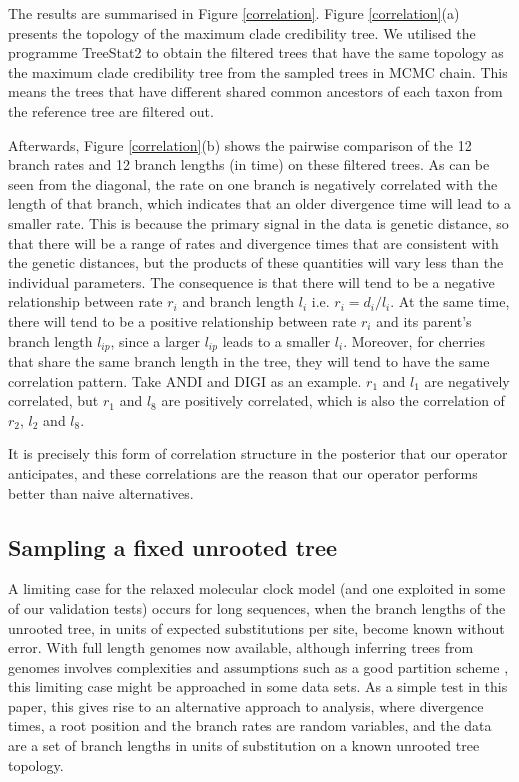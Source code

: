 \documentclass{bmcart}
\begin{document}
The results are summarised in Figure \ref{correlation}. Figure \ref{correlation}(a) presents the topology of the maximum clade credibility tree. We utilised the programme TreeStat2 \cite{TreeStat2} to obtain the filtered trees that have the same topology as the maximum clade credibility tree from the sampled trees in MCMC chain. This means the trees that have different shared common ancestors of each taxon from the reference tree are filtered out. 

Afterwards, Figure \ref{correlation}(b) shows the pairwise comparison of the 12 branch rates and 12 branch lengths (in time) on these filtered trees. As can be seen from the diagonal, the rate on one branch is negatively correlated with the length of that branch, which indicates that an older divergence time will lead to a smaller rate. This is because the primary signal in the data is genetic distance, so that there will be a range of rates and divergence times that are consistent with the genetic distances, but the products of these quantities will vary less than the individual parameters. The consequence is that there will tend to be a negative relationship between rate ${r_i}$ and branch length ${l_i}$ i.e. ${r_i} = {d_i}/{l_i}$. At the same time, there will tend to be a positive relationship between rate ${r_i}$ and its parent's branch length ${l_{ip}}$, since a larger ${l_{ip}}$ leads to a smaller ${l_i}$. Moreover, for cherries that share the same branch length in the tree, they will tend to have the same correlation pattern. Take ANDI and DIGI as an example. ${r_1}$ and ${l_1}$ are negatively correlated, but ${r_1}$ and ${l_8}$ are positively correlated, which is also the correlation of ${r_2}$, ${l_2}$ and ${l_8}$. 

It is precisely this form of correlation structure in the posterior that our operator anticipates, and these correlations are the reason that our operator performs better than naive alternatives.

\subsection*{Sampling a fixed unrooted tree}
A limiting case for the relaxed molecular clock model (and one exploited in some of our validation tests) occurs for long sequences, when the branch lengths of the unrooted tree, in units of expected substitutions per site, become known without error. With full length genomes now available, although inferring trees from genomes involves complexities and assumptions such as a good partition scheme \cite{lanfear2012partitionfinder}, this limiting case might be approached in some data sets. As a simple test in this paper, this gives rise to an alternative approach to analysis, where divergence times, a root position and the branch rates are random variables, and the data are a set of branch lengths in units of substitution on a known unrooted tree topology. 
\end{document}
